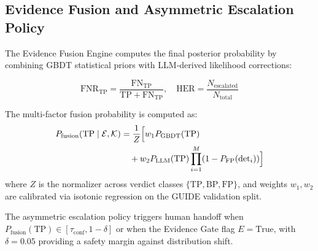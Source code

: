 \begin{table}[h]
\caption{Read-Only Tool Contracts and Output Provenance}
\label{tab:contracts}
\centering
{}
\end{table}

\subsection{Evidence Fusion and Asymmetric Escalation Policy}

The Evidence Fusion Engine computes the final posterior probability by combining
GBDT statistical priors with LLM-derived likelihood corrections:

\begin{equation}
\text{FNR}_{\text{TP}} = \frac{\text{FN}_{\text{TP}}}{\text{TP} + \text{FN}_{\text{TP}}},
\quad
\text{HER} = \frac{N_{\text{escalated}}}{N_{\text{total}}}
\end{equation}

The multi-factor fusion probability is computed as:
\begin{equation}
\begin{aligned}
P_{\text{fusion}}(\text{TP} \mid \mathcal{E}, \mathcal{K})
&= \frac{1}{Z} \Bigl[ w_1 P_{\text{GBDT}}(\text{TP}) \\
&\quad + w_2 P_{\text{LLM}}(\text{TP})
  \prod_{i=1}^{M} (1 - P_{\text{FP}}(\text{det}_i)) \Bigr]
\end{aligned}
\end{equation}
where $Z$ is the normalizer across verdict classes
$\{\text{TP}, \text{BP}, \text{FP}\}$, and weights $w_1, w_2$ are calibrated
via isotonic regression on the GUIDE validation split.

The asymmetric escalation policy triggers human handoff when
$P_{\text{fusion}}(\text{TP}) \in [\tau_{\text{conf}}, 1 - \delta]$ or
when the Evidence Gate flag $E = \text{True}$, with $\delta = 0.05$ providing
a safety margin against distribution shift.
